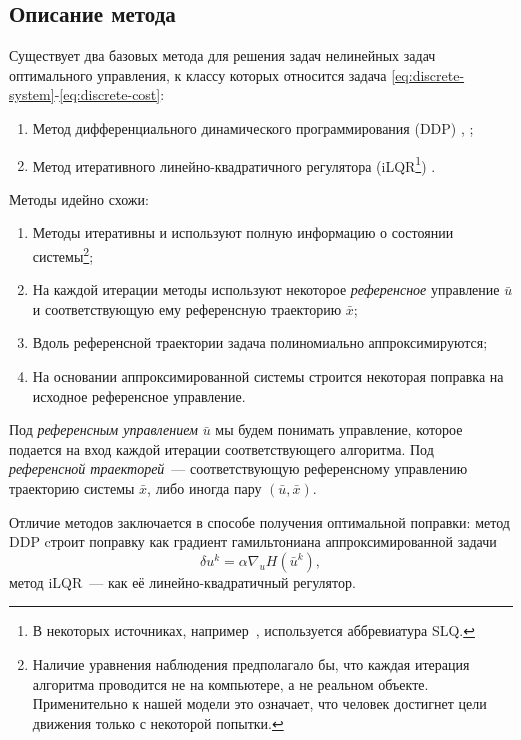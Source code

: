 \documentclass[../../doc.tex]{subfiles}
\begin{document}
    \subsection{Описание метода}

    Существует два базовых метода для решения задач нелинейных задач оптимального управления, к классу которых относится задача \eqref{eq:discrete-system}-\eqref{eq:discrete-cost}:
    \begin{enumerate}\itemsep0em
        \item Метод дифференциального динамического программирования (DDP) \cite{mayne1966}, \cite{murray1984};
        \item Метод итеративного линейно-квадратичного регулятора (iLQR\footnote{В некоторых источниках, например~\cite{sideris2005}, используется аббревиатура SLQ.}) \cite{li2004}.
    \end{enumerate}
    Методы идейно схожи:
    \begin{enumerate}\itemsep0em
        \item Методы итеративны и используют полную информацию о состоянии системы\footnote{Наличие уравнения наблюдения предполагало бы, что каждая итерация алгоритма проводится не на компьютере, а не реальном объекте. Применительно к нашей модели это означает, что человек достигнет цели движения только с некоторой попытки.};
        \item На каждой итерации методы используют некоторое \textit{референсное} управление $\bar u$ и соответствующую ему референсную траекторию $\bar x$;
        \item Вдоль референсной траектории задача полиномиально аппроксимируются;
        \item На основании аппроксимированной системы строится некоторая поп\-равка на исходное референсное управление.
    \end{enumerate}

    \begin{definition}
        Под \textit{референсным управлением} $\bar u$ мы будем понимать управление, которое подается на вход каждой итерации соответствующего алгоритма.
        Под \textit{референсной траекторей}~--- соответствующую референсному управлению траекторию системы $\bar x$, либо иногда пару $(\bar u, \bar x)$.
    \end{definition}

    Отличие методов заключается в способе получения оптимальной поправки:
    метод DDP cтроит поправку как градиент гамильтониана аппроксимированной задачи
    $$
        \delta u^k = \alpha \nabla_u H(\bar u^k),
    $$
    метод iLQR~--- как её линейно-квадратичный регулятор.
\end{document}
